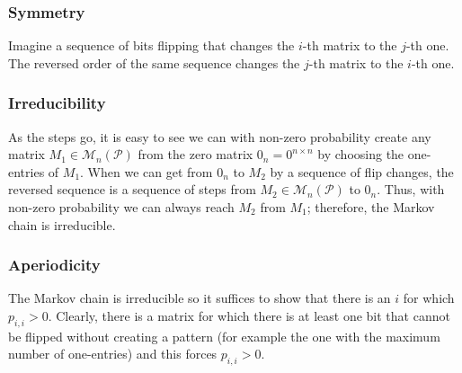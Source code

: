 \subsubsection{Symmetry}
Imagine a sequence of bits flipping that changes the $i$-th matrix to the $j$-th one. The reversed order of the same sequence changes the $j$-th matrix to the $i$-th one.
\subsubsection{Irreducibility}
As the steps go, it is easy to see we can with non-zero probability create any matrix $M_1\in\mathcal{M}_n(\mathcal{P})$ from the zero matrix $0_n=0^{n\times n}$ by choosing the one-entries of $M_1$. When we can get from $0_n$ to $M_2$ by a sequence of flip changes, the reversed sequence is a sequence of steps from $M_2\in\mathcal{M}_n(\mathcal{P})$ to $0_n$. Thus, with non-zero probability we can always reach $M_2$ from $M_1$; therefore, the Markov chain is irreducible.
\subsubsection{Aperiodicity}
The Markov chain is irreducible so it suffices to show that there is an $i$ for which $p_{i,i}>0$. Clearly, there is a matrix for which there is at least one bit that cannot be flipped without creating a pattern (for example the one with the maximum number of one-entries) and this forces $p_{i,i}>0$.